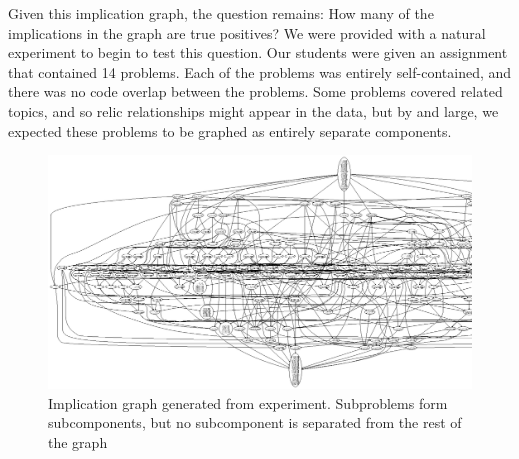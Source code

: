 \documentclass[11pt,twoside]{article}
\theoremstyle{definition}
\begin{document}
Given this implication graph, the question remains: How many of the implications in the graph are true positives? We were provided with a natural experiment to begin to test this question. Our students were given an assignment that contained 14 problems. Each of the problems was entirely self-contained, and there was no code overlap between the problems. Some problems covered related topics, and so relic relationships might appear in the data, but by and large, we expected these problems to be graphed as entirely separate components.

\begin{figure}
\includegraphics[width=\textwidth]{div.ps}
\caption{Implication graph generated from experiment. Subproblems form subcomponents, but no subcomponent is separated from the rest of the graph}
\end{figure}

\end{document}
